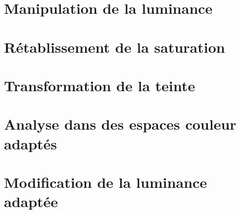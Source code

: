 \documentclass[a4paper]{article}
\begin{document}
\clearpage

\section{Manipulation de la luminance}

\clearpage

\section{Rétablissement de la saturation}

\clearpage

\section{Transformation de la teinte}

\clearpage


\section{Analyse dans des espaces couleur adaptés}

\clearpage

\section{Modification de la luminance adaptée}
\end{document}

